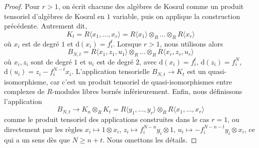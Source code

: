 \begin{proof}
\medskip\noindent

Pour $r > 1$, on écrit chacune des algèbres de Koszul comme un produit tensoriel d'algèbres de Koszul en $1$ variable, puis on applique la construction précédente. Autrement dit,
$$
K_t = R\langle x_1, \ldots, x_r\rangle =
R\langle x_1\rangle \otimes_R \ldots \otimes_R R\langle x_r\rangle
$$
où $x_i$ est de degré $1$ et $\text{d}(x_i) = f_i^t$. Lorsque $r > 1$, nous utilisons alors
$$
B_{N, t} =
R\langle x_1, z_1, u_1 \rangle
\otimes_R \ldots \otimes_R
R\langle x_r, z_r, u_r \rangle
$$
où $x_i, z_i$ sont de degré $1$ et $u_i$ est de degré $2$, avec
$\text{d}(x_i) = f_i^t$, $\text{d}(z_i) = f_i^N$,
$\text{d}(u_i) = z_i - f_i^{N - t}x_i$. L'application tensorielle $B_{N, t} \to K_t$ est un quasi-isomorphisme, car c'est un produit tensoriel de quasi-isomorphismes entre complexes de $R$-modules libres bornés inférieurement. Enfin, nous définissons l'application
$$
B_{N, t}
\to
K_n \otimes_R K_t =
R\langle y_1, \ldots, y_r\rangle \otimes_R
R\langle x_1, \ldots, x_r\rangle
$$
comme le produit tensoriel des applications construites dans le cas $r = 1$,
ou directement par les règles $x_i \mapsto 1 \otimes x_i$,
$z_i \mapsto f_i^{N - n}y_i \otimes 1$,
$u_i \mapsto - f_i^{N - n - t}y_i \otimes x_i$, ce qui a un sens dès que $N \geq n + t$. Nous omettons les détails.

\end{proof}









 


